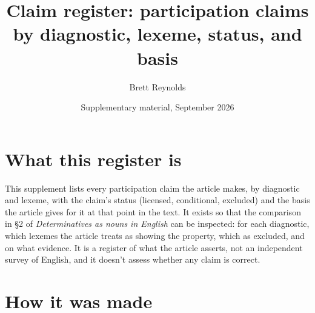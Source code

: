 \documentclass[12pt]{article}
\title{Claim register: participation claims by diagnostic, lexeme, status, and basis}
\author{Brett Reynolds}
\date{Supplementary material, September 2026}
\begin{document}
\maketitle

\section{What this register is}

This supplement lists every participation claim the article makes, by diagnostic and lexeme, with the claim's status (licensed, conditional, excluded) and the basis the article gives for it at that point in the text. It exists so that the comparison in §2 of \textit{Determinatives as nouns in English} can be inspected: for each diagnostic, which lexemes the article treats as showing the property, which as excluded, and on what evidence. It is a register of what the article asserts, not an independent survey of English, and it doesn't assess whether any claim is correct.

\section{How it was made}
\end{document}
